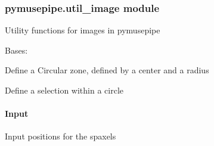 \documentclass[letterpaper,10pt,english]{sphinxmanual}
\begin{document}
\subsubsection{pymusepipe.util\_image module}
\label{\detokenize{api/pymusepipe:module-pymusepipe.util_image}}\label{\detokenize{api/pymusepipe:pymusepipe-util-image-module}}
\sphinxAtStartPar
Utility functions for images in pymusepipe

\begin{fulllineitems}
\label{\detokenize{api/pymusepipe:pymusepipe.util_image.CircleZone}}
\pysigstartsignatures
{}
\pysigstopsignatures
\sphinxAtStartPar
Bases: {\hyperref[\detokenize{api/pymusepipe:pymusepipe.util_image.SelectionZone}]{}}

\sphinxAtStartPar
Define a Circular zone, defined by
a center and a radius

\begin{fulllineitems}
\label{\detokenize{api/pymusepipe:pymusepipe.util_image.CircleZone.select}}
\pysigstartsignatures
{}
\pysigstopsignatures
\sphinxAtStartPar
Define a selection within a circle


\paragraph{Input}
\label{\detokenize{api/pymusepipe:id121}}\begin{description}
\sphinxAtStartPar
Input positions for the spaxels

\end{description}

\end{fulllineitems}


\end{fulllineitems}
\end{document}
